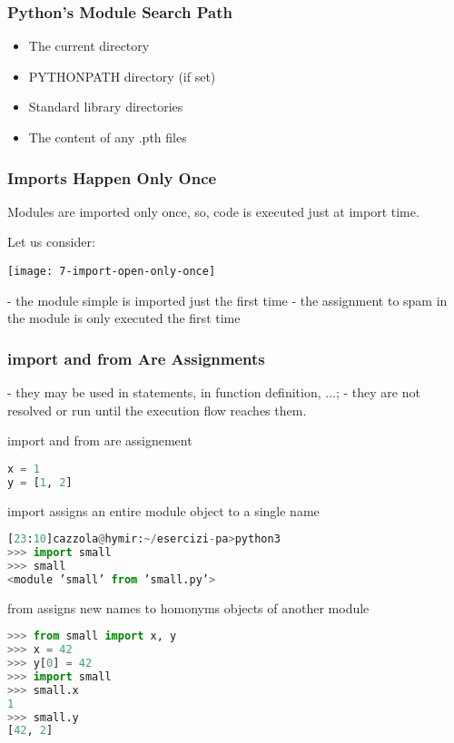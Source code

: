 \subsubsection{Python’s Module Search Path}

\begin{itemize}
  \item The current directory
  \item PYTHONPATH directory (if set)
  \item Standard library directories
  \item The content of any .pth files
\end{itemize}

\subsubsection{Imports Happen Only Once}

Modules are imported only once, so, code is executed just at import time.

Let us consider:
\begin{center}
  \texttt{[image: 7-import-open-only-once]}
\end{center}

- the module simple is imported just the first time
- the assignment to spam in the module is only executed the first time

\subsubsection{import and from Are Assignments}

- they may be used in statements, in function definition, ...;
- they are not resolved or run until the execution flow reaches them.

import and from are assignement
\begin{lstlisting}[language=Python]
x = 1
y = [1, 2]
\end{lstlisting}

import assigns an entire module object to a single name

\begin{lstlisting}[language=Python]
[23:10]cazzola@hymir:~/esercizi-pa>python3
>>> import small
>>> small
<module ’small’ from ’small.py’>
\end{lstlisting}

from assigns new names to homonyms objects of another module

\begin{lstlisting}[language=Python]
>>> from small import x, y
>>> x = 42
>>> y[0] = 42
>>> import small
>>> small.x
1
>>> small.y
[42, 2]
\end{lstlisting}

